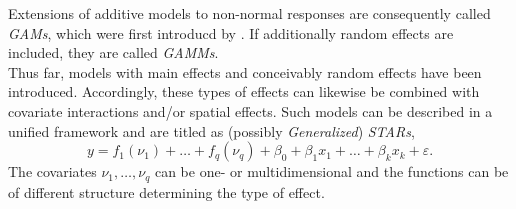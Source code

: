 

Extensions of additive models to non-normal responses are consequently called \textit{\acp{GAM}}, which were first introducd by \cite{hastie1986}. If additionally random effects are included, they are called \textit{\acp{GAMM}}.\\
Thus far, models with main effects and conceivably random effects have been introduced. Accordingly, these types of effects can likewise be combined with covariate interactions and/or spatial effects. Such models can be described in a unified framework and are titled as (possibly \textit{Generalized}) \textit{\acp{STAR}},
\begin{equation}
y=f_{1}\left(\nu_{1}\right)+\ldots+f_{q}\left(\nu_{q}\right)+\beta_{0}+\beta_{1} x_{1}+\ldots+\beta_{k} x_{k}+\varepsilon.
\end{equation}
The covariates $\nu_1, \ldots, \nu_q$ can be one- or multidimensional and the functions can be of different structure determining the type of effect.




